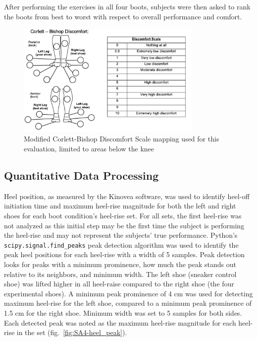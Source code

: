 \documentclass[defaultstyle,11pt]{thesis}
\begin{document}
After performing the exercises in all four boots, subjects were then asked to rank the boots from best to worst with respect to overall performance and comfort.

\begin{figure}
\hypertarget{fig:SA4-CB}{%
\centering
\includegraphics[width=0.8\textwidth,height=\textheight]{../fig/SA4/Corlett-Bishop.png}
\caption{Modified Corlett-Bishop Discomfort Scale mapping used for this evaluation, limited to areas below the knee}\label{fig:SA4-CB}
}
\end{figure}

\hypertarget{quantitative-data-processing}{%
\subsection{Quantitative Data Processing}\label{quantitative-data-processing}}

Heel position, as measured by the Kinovea software, was used to identify heel-off initiation time and maximum heel-rise magnitude for both the left and right shoes for each boot condition's heel-rise set.
For all sets, the first heel-rise was not analyzed as this initial step may be the first time the subject is performing the heel-rise and may not represent the subjects' true performance.
Python's \texttt{scipy.signal.find\_peaks} peak detection algorithm was used to identify the peak heel positions for each heel-rise with a width of 5 samples.
Peak detection looks for peaks with a minimum prominence, how much the peak stands out relative to its neighbors, and minimum width.
The left shoe (sneaker control shoe) was lifted higher in all heel-raise compared to the right shoe (the four experimental shoes).
A minimum peak prominence of 4 cm was used for detecting maximum heel-rise for the left shoe, compared to a minimum peak prominence of 1.5 cm for the right shoe.
Minimum width was set to 5 samples for both sides.
Each detected peak was noted as the maximum heel-rise magnitude for each heel-rise in the set (fig.~\ref{fig:SA4-heel_peak}).
\end{document}
